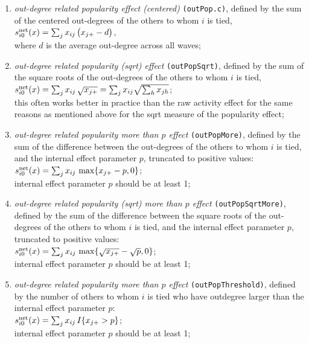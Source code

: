 \documentclass[a4paper,fleqn,11pt]{article}
\newcommand{\+}{\, + \,}
\newcommand{\vit}{\theenumi}
\begin{document}
\begin{enumerate}
 \item {\em out-degree related popularity effect (centered)} \texttt{(outPop.c)},
 defined by the sum of
 the centered out-degrees of the others to whom $i$ is tied,\\
 $s^{\rm net}_{i\vit}(x) =  \sum_j x_{ij}\, \big( x_{j+} - d \big)$,\\
 where $d$ is the average out-degree across all waves;

 \item {\em out-degree related popularity (sqrt) effect} \texttt{(outPopSqrt)},
 defined by the sum of
 the square roots of the out-degrees of the others to whom $i$ is tied,\\
 $s^{\rm net}_{i\vit}(x) = \sum_j x_{ij}\, \sqrt{x_{j+}} =
  \sum_j x_{ij} \sqrt{\sum_h x_{jh}} $;\\
 this often works better in practice than the raw activity effect
 for the same reasons as mentioned above for the sqrt measure of the popularity effect;

 \item {\em out-degree related popularity more than $p$ effect} \texttt{(outPopMore)}, defined by
  the sum of the difference between the out-degrees  of the others to whom $i$ is tied,
  and the internal effect parameter $p$, truncated to positive values: \\
 $s^{\rm net}_{i\vit}(x) =  \sum_j x_{ij}\, \max\{ x_{j+} - p, 0 \}  $;\\
 internal effect parameter $p$ should be at least 1;


 \item {\em out-degree related popularity (sqrt) more than $p$ effect}
 \texttt{(outPopSqrtMore)}, defined by
  the sum of the difference between the square roots of the
  out-degrees  of the others to whom $i$ is tied,
  and the internal effect parameter $p$, truncated to positive values: \\
 $s^{\rm net}_{i\vit}(x) =  \sum_j x_{ij}\, \max\{ \sqrt{x_{j+}} - \sqrt{p}, 0 \}  $;\\
 internal effect parameter $p$ should be at least 1;


 \item {\em out-degree related popularity more than $p$ effect} \texttt{(outPopThreshold)}, defined by
  the number of others to whom $i$ is tied who have outdegree larger than the
  internal effect parameter $p$: \\
 $s^{\rm net}_{i\vit}(x) =  \sum_j x_{ij}\, I\{ x_{j+} > p \}  $;\\
 internal effect parameter $p$ should be at least 1;


\end{enumerate}
\end{document}
